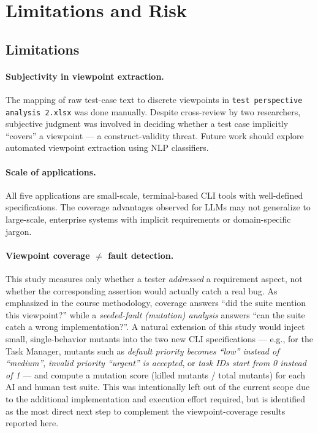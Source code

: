 \documentclass[12pt,a4paper]{article}
\begin{document}
\section{Limitations and Risk}

\subsection{Limitations}

\paragraph{Subjectivity in viewpoint extraction.} The mapping of raw test-case text to discrete viewpoints in \texttt{test perspective analysis 2.xlsx} was done manually. Despite cross-review by two researchers, subjective judgment was involved in deciding whether a test case implicitly ``covers'' a viewpoint --- a construct-validity threat. Future work should explore automated viewpoint extraction using NLP classifiers.

\paragraph{Scale of applications.} All five applications are small-scale, terminal-based CLI tools with well-defined specifications. The coverage advantages observed for LLMs may not generalize to large-scale, enterprise systems with implicit requirements or domain-specific jargon.

\paragraph{Viewpoint coverage $\neq$ fault detection.} This study measures only whether a tester \emph{addressed} a requirement aspect, not whether the corresponding assertion would actually catch a real bug. As emphasized in the course methodology, coverage answers ``did the suite mention this viewpoint?'' while a \emph{seeded-fault (mutation) analysis} answers ``can the suite catch a wrong implementation?''. A natural extension of this study would inject small, single-behavior mutants into the two new CLI specifications --- e.g., for the Task Manager, mutants such as \emph{default priority becomes ``low'' instead of ``medium''}, \emph{invalid priority ``urgent'' is accepted}, or \emph{task IDs start from 0 instead of 1} --- and compute a mutation score (killed mutants / total mutants) for each AI and human test suite. This was intentionally left out of the current scope due to the additional implementation and execution effort required, but is identified as the most direct next step to complement the viewpoint-coverage results reported here.
\end{document}
